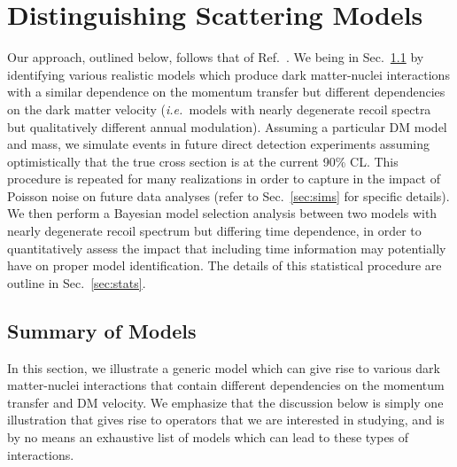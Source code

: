 \documentclass[11pt]{article}
\newcommand{\ie}{{\it i.e.~}}  \newcommand{\eg}{{\it e.g.~}}
\newcommand{\Sec}[1]{Sec.~\ref{#1}} \newcommand{\Secs}[2]{Secs.~\ref{#1} and \ref{#2}} \newcommand{\Secm}[2]{Secs.~\ref{#1} through \ref{#2}}
\begin{document}
\section{Distinguishing Scattering Models}\label{sec:procedure}
Our approach, outlined below, follows that of Ref.~\cite{Gluscevic:2015sqa}. We being in Sec.~\ref{sec:models} by identifying various realistic models which produce dark matter-nuclei interactions with a similar dependence on the momentum transfer but different dependencies on the dark matter velocity (\ie models with nearly degenerate recoil spectra but qualitatively different annual modulation). Assuming a particular DM model and mass, we simulate events in future direct detection experiments assuming optimistically that the true cross section is at the current 90\% CL. This procedure is repeated for many realizations in order to capture in the impact of Poisson noise on future data analyses (refer to \Sec{sec:sims} for specific details). We then perform a Bayesian model selection analysis between two models with nearly degenerate recoil spectrum but differing time dependence, in order to quantitatively assess the impact that including time information may potentially have on proper model identification. The details of this statistical procedure are outline in \Sec{sec:stats}.
 


\subsection{Summary of Models}\label{sec:models}
In this section, we illustrate a generic model which can give rise to various dark matter-nuclei interactions that contain different dependencies on the momentum transfer and DM velocity. We emphasize that the discussion below is simply one illustration that gives rise to operators that we are interested in studying, and is by no means an exhaustive list of models which can lead to these types of interactions.
\end{document}
